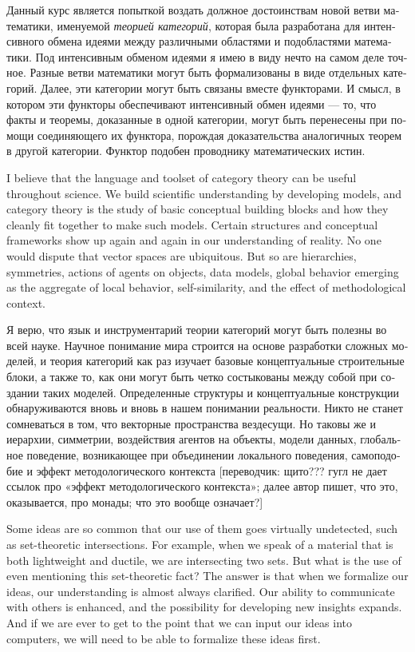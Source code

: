 \documentclass[a4paper]{book}
\theoremstyle{myth}
\begin{document}
\begin{russian}
Данный курс является попыткой воздать должное достоинствам новой ветви математики, именуемой {\em теорией категорий}, которая была разработана для интенсивного обмена идеями между различными областями и подобластями математики. Под интенсивным обменом идеями я имею в виду нечто на самом деле точное. Разные ветви математики могут быть формализованы в виде отдельных категорий. Далее, эти категории могут быть связаны вместе функторами. И смысл, в котором эти функторы обеспечивают интенсивный обмен идеями — то, что факты и теоремы, доказанные в одной категории, могут быть перенесены при помощи соединяющего их функтора, порождая доказательства аналогичных теорем в другой категории. Функтор подобен проводнику математических истин. 

I believe that the language and toolset of category theory can be useful throughout science. We build scientific understanding by developing models, and category theory is the study of basic conceptual building blocks and how they cleanly fit together to make such models. Certain structures and conceptual frameworks show up again and again in our understanding of reality. No one would dispute that vector spaces are ubiquitous. But so are hierarchies, symmetries, actions of agents on objects, data models, global behavior emerging as the aggregate of local behavior, self-similarity, and the effect of methodological context.

Я верю, что язык и инструментарий теории категорий могут быть полезны во всей науке. Научное понимание мира строится на основе разработки сложных моделей, и теория категорий как раз изучает базовые концептуальные строительные блоки, а также то, как они могут быть четко состыкованы между собой при создании таких моделей. Определенные структуры и концептуальные конструкции обнаруживаются вновь и вновь в нашем понимании реальности. Никто не станет сомневаться в том, что векторные пространства вездесущи. Но таковы же и иерархии, симметрии, воздействия агентов на объекты, модели данных, глобальное поведение, возникающее при объединении локального поведения, самоподобие и эффект методологического контекста [переводчик: щито??? гугл не дает ссылок про «эффект методологического контекста»; далее автор пишет, что это, оказывается, про монады; что это вообще означает?] 

Some ideas are so common that our use of them goes virtually undetected, such as set-theoretic intersections. For example, when we speak of a material that is both lightweight and ductile, we are intersecting two sets. But what is the use of even mentioning this set-theoretic fact? The answer is that when we formalize our ideas, our understanding is almost always clarified. Our ability to communicate with others is enhanced, and the possibility for developing new insights expands. And if we are ever to get to the point that we can input our ideas into computers, we will need to be able to formalize these ideas first.


\end{russian}
\end{document}
